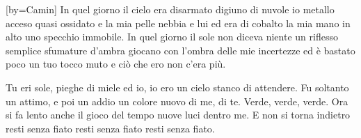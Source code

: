 [by={Camin}]
\chordsoff
\beginverse*
In quel giorno il cielo era disarmato 
digiuno di nuvole 
io metallo acceso quasi ossidato 
e la mia pelle nebbia e lui 
ed era di cobalto la mia mano in alto 
uno specchio immobile. 
\endverse
\beginverse*
In quel giorno il sole non diceva niente 
un riflesso semplice 
sfumature d'ambra giocano con l'ombra 
delle mie incertezze 
ed è bastato poco un tuo tocco muto 
e ciò che ero non c'era più. 
\endverse

\beginverse*
Tu eri sole, pieghe di miele 
ed io, io ero un cielo stanco di attendere. 
Fu soltanto un attimo, e poi un addio 
un colore nuovo di me, di te. 
Verde, verde, verde. 
\endverse
\beginverse*
Ora si fa lento anche il gioco del tempo 
nuove luci dentro me. 
E non si torna indietro 
resti senza fiato
resti senza fiato
resti senza fiato.
\endverse
\endsong